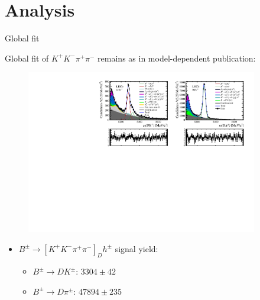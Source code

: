 \documentclass[xcolor={dvipsnames}]{beamer}
\begin{document}
\section{Analysis}
\begin{frame}{Global fit}
  \begin{center}
    {\large Global fit of $K^+K^-\pi^+\pi^-$ remains as in model-dependent publication:}
  \end{center}
  \vspace{-0.5cm}
  \begin{figure}
    \centering
    \includegraphics[width = 0.9\textwidth,trim={0 0 0 0},clip=true]{Plots/d2kkpipi_fiveL_allDP.pdf}
  \end{figure}
  \vspace{-0.5cm}
  \begin{itemize}
    \item{$B^\pm\to[K^+K^-\pi^+\pi^-]_Dh^\pm$ signal yield:}
    \begin{itemize}
      \item{$B^\pm\to DK^\pm$: $3304 \pm 42$}
      \item{$B^\pm\to D\pi^\pm$: $47894 \pm 235$}
    \end{itemize}
  \end{itemize}
\end{frame}
\end{document}

